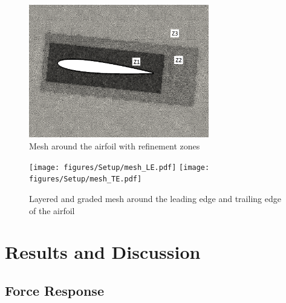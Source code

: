 \begin{figure}[H]
\centering
\includegraphics[width=0.7\textwidth]{figures/Setup/mesh_screenshot.pdf}
\caption{Mesh around the airfoil with refinement zones}
\label{fig:mesh}
\end{figure}

\begin{figure}[H]
\centering
\texttt{[image: figures/Setup/mesh\_LE.pdf]}
\texttt{[image: figures/Setup/mesh\_TE.pdf]}
\caption{Layered and graded mesh around the leading edge and trailing edge of the airfoil}
\label{fig:mesh2}
\end{figure}

\section{Results and Discussion}

\subsection{Force Response}

